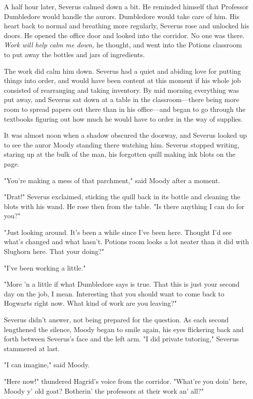 A half hour later, Severus calmed down a bit. He reminded himself that Professor Dumbledore would handle the aurors. Dumbledore would take care of him. His heart back to normal and breathing more regularly, Severus rose and unlocked his doors. He opened the office door and looked into the corridor. No one was there. \emph{Work will help calm me down,} he thought, and went into the Potions classroom to put away the bottles and jars of ingredients.

The work did calm him down. Severus had a quiet and abiding love for putting things into order, and would have been content at this moment if his whole job consisted of rearranging and taking inventory. By mid morning everything was put away, and Severus sat down at a table in the classroom—there being more room to spread papers out there than in his office—and began to go through the textbooks figuring out how much he would have to order in the way of supplies.

It was almost noon when a shadow obscured the doorway, and Severus looked up to see the auror Moody standing there watching him. Severus stopped writing, staring up at the bulk of the man, his forgotten quill making ink blots on the page.

"You're making a mess of that parchment," said Moody after a moment.

"Drat!" Severus exclaimed, sticking the quill back in its bottle and cleaning the blots with his wand. He rose then from the table. "Is there anything I can do for you?"

"Just looking around. It's been a while since I've been here. Thought I'd see what's changed and what hasn't. Potions room looks a lot neater than it did with Slughorn here. That your doing?"

"I've been working a little."

"More 'n a little if what Dumbledore says is true. That this is just your second day on the job, I mean. Interesting that you should want to come back to Hogwarts right now. What kind of work are you leaving?"

Severus didn't answer, not being prepared for the question. As each second lengthened the silence, Moody began to smile again, his eyes flickering back and forth between Severus's face and the left arm. "I{\el} did{\el} private tutoring," Severus stammered at last.

"I can imagine," said Moody.

"Here now!" thundered Hagrid's voice from the corridor. "What're you doin' here, Moody y' old goat? Botherin' the professors at their work an' all?"

